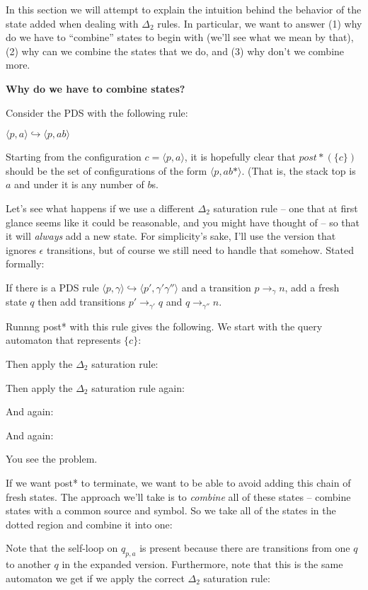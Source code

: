 \documentclass{article}
\newcommand{\Config}[2]{\ensuremath{\langle #1, #2 \rangle}}
\newcommand{\Rule}[2]{\ensuremath{#1 \hookrightarrow #2}}
\newcommand{\Trans}[3]{\ensuremath{#1 \rightarrow_{#2} #3}}
\newcommand{\subsubsubsection}[1]{\textbf{#1}}
\begin{document}
In this section we will attempt to explain the intuition behind the
behavior of the state added when dealing with $\Delta_2$ rules.  In
particular, we want to answer (1) why do we have to ``combine'' states
to begin with (we'll see what we mean by that), (2) why can we combine
the states that we do, and (3) why don't we combine more.

\subsubsubsection{Why do we have to combine states?}

Consider the PDS with the following rule:

  \Rule{\Config{p}{a}}{\Config{p}{ab}}

Starting from the configuration $c = \Config{p}{a}$, it is hopefully
clear that $post*(\{c\})$ should be the set of configurations of the
form \Config{p}{ab*}. (That is, the stack top is $a$ and under it is
any number of $b$s.

Let's see what happens if we use a different $\Delta_2$ saturation
rule -- one that at first glance seems like it could be reasonable,
and you might have thought of -- so that it will \emph{always} add a
new state. For simplicity's sake, I'll use the version that ignores
$\epsilon$ transitions, but of course we still need to handle that
somehow. Stated formally:

   If there is a PDS rule
   \Rule{\Config{p}{\gamma}}{\Config{p'}{\gamma'\gamma''}} and a
   transition \Trans{p}{\gamma}{n}, add a fresh state $q$ then add
   transitions \Trans{p'}{\gamma'}{q} and \Trans{q}{\gamma''}{n}.

Runnng post* with this rule gives the following. We start with the
query automaton that represents $\{c\}$:

Then apply the $\Delta_2$ saturation rule:

Then apply the $\Delta_2$ saturation rule again:

And again:

And again:

You see the problem.

If we want post* to terminate, we want to be able to avoid adding this
chain of fresh states. The approach we'll take is to \emph{combine}
all of these states -- combine states with a common source and
symbol. So we take all of the states in the dotted region and combine
it into one:


Note that the self-loop on $q_{p,a}$ is present because there are
transitions from one $q$ to another $q$ in the expanded
version. Furthermore, note that this is the same automaton we get if
we apply the correct $\Delta_2$ saturation rule:
\end{document}
